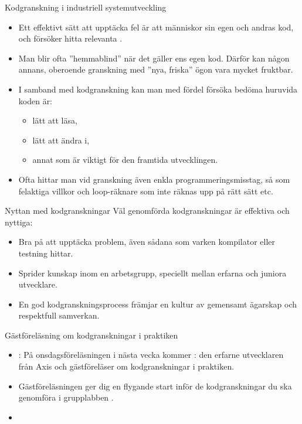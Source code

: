 \begin{Slide}{Kodgranskning i industriell systemutveckling}
\begin{itemize}
\item Ett effektivt sätt att upptäcka fel är att människor  sin egen och andras kod, och försöker hitta relevanta . 
\item Man blir ofta ''hemmablind'' när det gäller ens egen kod. Därför kan någon annans, oberoende granskning med ''nya, friska'' ögon vara mycket fruktbar. 
\item I samband med kodgranskning kan man med fördel försöka bedöma  huruvida koden är:
\begin{itemize}
\item lätt att läsa, 
\item lätt att ändra i,  
\item annat som är viktigt för den framtida utvecklingen.
\end{itemize}
\item Ofta hittar man vid granskning även enkla programmeringsmisstag, så som felaktiga villkor och loop-räknare som inte räknas upp på rätt sätt etc.
\end{itemize}
\end{Slide}

\begin{Slide}{Nyttan med kodgranskningar}
Väl genomförda kodgranskningar är effektiva och nyttiga:
\begin{itemize}
\item Bra på att upptäcka problem, även sådana som varken kompilator eller testning hittar.
\item Sprider kunskap inom en arbetsgrupp, speciellt mellan erfarna och juniora utvecklare.
\item En god kodgranskningsprocess främjar en kultur av gemensamt ägarskap och respektfull samverkan.
\end{itemize}
\end{Slide}




\ifkompendium\else
\begin{Slide}{Gästföreläsning om kodgranskningar i praktiken}
\begin{itemize}
\item {}: På onsdagsföreläsningen i nästa vecka kommer : den erfarne utvecklaren  från Axis och gästföreläser om kodgranskningar i praktiken. 
\item Gästföreläsningen ger dig en flygande start inför de kodgranskningar du ska genomföra i grupplabben .
\item {}
\end{itemize}
\end{Slide}
\fi
